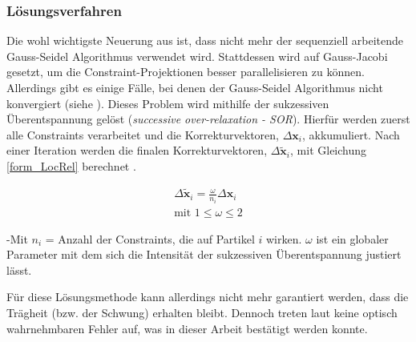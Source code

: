 
\subsubsection{Lösungsverfahren}
Die wohl wichtigste Neuerung aus \cite{UPP} ist, dass nicht mehr der sequenziell arbeitende Gauss-Seidel Algorithmus verwendet wird. Stattdessen wird auf Gauss-Jacobi gesetzt, um die Constraint-Projektionen besser parallelisieren zu können. Allerdings gibt es einige Fälle, bei denen der Gauss-Seidel Algorithmus nicht konvergiert (siehe \cite{UPP}).
Dieses Problem wird mithilfe der sukzessiven Überentspannung gelöst (\textit{successive over-relaxation - SOR}). Hierfür werden zuerst alle Constraints verarbeitet und die Korrekturvektoren, $\Delta \textbf{x}_i$, akkumuliert. Nach einer Iteration werden die finalen Korrekturvektoren, $\Delta \widetilde{\textbf{x}}_i$, mit Gleichung \ref{form_LocRel} berechnet \cite{UPP}.

\begin{equation}
\begin{split}
\Delta \widetilde{\textbf{x}}_i = \frac{\omega}{n_i} \Delta \textbf{x}_i \\
\text{mit }  1 \leq \omega \leq 2
\end{split}
\label{form_LocRel}
\end{equation}

-Mit $n_i$ = Anzahl der Constraints, die auf Partikel $i$ wirken. $\omega$ ist ein globaler Parameter mit dem sich die Intensität der sukzessiven Überentspannung justiert lässt.

Für diese Lösungsmethode kann allerdings nicht mehr garantiert werden, dass die Trägheit (bzw. der Schwung) erhalten bleibt. Dennoch treten laut \cite{UPP} keine optisch wahrnehmbaren Fehler auf, was in dieser Arbeit bestätigt werden konnte.



